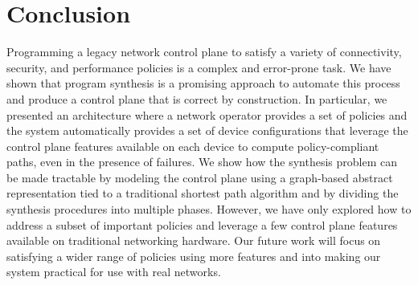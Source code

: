 \section{Conclusion}
Programming a legacy network control plane to satisfy a variety of
connectivity, security, and performance policies is a complex and error-prone
task. We have shown that program synthesis is a promising approach to automate
this process and produce a control plane that is correct by construction.
In particular, we presented an architecture where a network operator provides
a set of policies 
and the system automatically provides a set of device configurations that
leverage the control plane features available on each device to compute
policy-compliant paths, even in the presence of failures.  
We show how the synthesis problem can be made tractable 
 by modeling the control plane using a graph-based 
abstract representation tied to a traditional shortest path algorithm and
by dividing the synthesis procedures into multiple phases. However, we
have only explored how to address a subset of important policies and leverage a
few control plane features available on traditional networking hardware. Our
future work will focus on satisfying a wider range of policies using more
features and into making our system practical for use with real networks.
